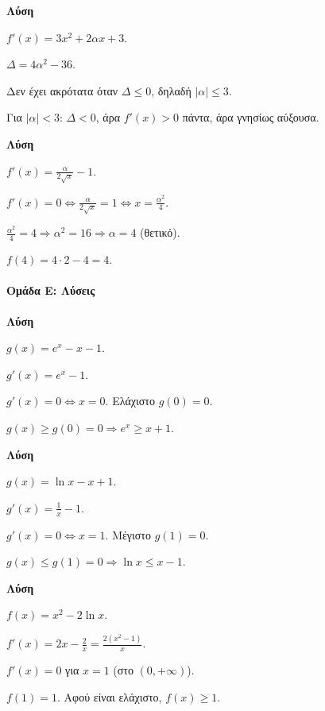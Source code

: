 \documentclass[11pt,a4paper,modern]{FFExercises}
\begin{document}
\askhsh %
\textbf{Λύση}
\begin{alist}
    \item $f'(x) = 3x^2 + 2\alpha x + 3$.
    \item $\Delta = 4\alpha^2 - 36$.
    \item Δεν έχει ακρότατα όταν $\Delta \le 0$, δηλαδή $|\alpha| \le 3$.
    \item Για $|\alpha| < 3$: $\Delta < 0$, άρα $f'(x) > 0$ πάντα, άρα γνησίως αύξουσα.
\end{alist}

\askhsh %
\textbf{Λύση}
\begin{alist}
    \item $f'(x) = \frac{\alpha}{2\sqrt{x}} - 1$.
    \item $f'(x) = 0 \Leftrightarrow \frac{\alpha}{2\sqrt{x}} = 1 \Leftrightarrow x = \frac{\alpha^2}{4}$.
    \item $\frac{\alpha^2}{4} = 4 \Rightarrow \alpha^2 = 16 \Rightarrow \alpha = 4$ (θετικό).
    \item $f(4) = 4 \cdot 2 - 4 = 4$.
\end{alist}

\paragraph{Ομάδα Ε: Λύσεις}

\askhsh %
\textbf{Λύση}
\begin{alist}
    \item $g(x) = e^x - x - 1$.
    \item $g'(x) = e^x - 1$.
    \item $g'(x) = 0 \Leftrightarrow x = 0$. Ελάχιστο $g(0) = 0$.
    \item $g(x) \ge g(0) = 0 \Rightarrow e^x \ge x + 1$.
\end{alist}

\askhsh %
\textbf{Λύση}
\begin{alist}
    \item $g(x) = \ln x - x + 1$.
    \item $g'(x) = \frac{1}{x} - 1$.
    \item $g'(x) = 0 \Leftrightarrow x = 1$. Μέγιστο $g(1) = 0$.
    \item $g(x) \le g(1) = 0 \Rightarrow \ln x \le x - 1$.
\end{alist}

\askhsh %
\textbf{Λύση}
\begin{alist}
    \item $f(x) = x^2 - 2\ln x$.
    \item $f'(x) = 2x - \frac{2}{x} = \frac{2(x^2-1)}{x}$.
    \item $f'(x) = 0$ για $x = 1$ (στο $(0, +\infty)$).
    \item $f(1) = 1$. Αφού είναι ελάχιστο, $f(x) \ge 1$.
\end{alist}
\end{document}
